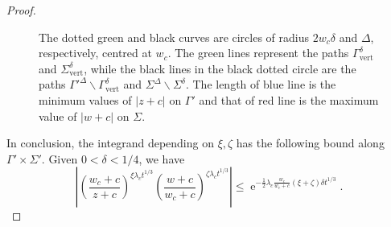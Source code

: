 \documentclass[cmp]{svjour}
\numberwithin{theorem}{section}
\numberwithin{equation}{section}
\DeclareMathOperator{\e}{e}
\begin{document}
\begin{proof}
\begin{figure}[h]
\begin{center}
\end{center}
\caption{The dotted green and black curves are circles of radius $2 w_c \delta$ and $\Delta$, respectively, centred at $w_c$. The green lines represent the paths $\Gamma^{\delta}_{\mathrm{vert}} $ and $ \Sigma^{\delta}_{\mathrm{vert}}$, while the black lines in the black dotted circle are the paths ${\Gamma'}^\Delta \backslash \Gamma^\delta_{\mathrm{vert}}$ and $\Sigma^\Delta \backslash \Sigma^\delta$. The length of blue line is the minimum values of $|z + c|$ on $\Gamma'$ and that of red line is the maximum value of $|w + c|$ on $\Sigma$.}
\label{Fig.CotourVicinityw_c1_text}
\end{figure}




In conclusion, the integrand depending on $\xi,\zeta$ has the following bound along $\Gamma'\times \Sigma'$. Given $0<\delta<1/4$, we have
\begin{equation}\label{XiZetaTermBound}
	\left| 
	\left(\frac{w_c+c}{z+c}\right)^{\xi \lambda_c t^{1/3}}
	\left(\frac{w+c}{w_c+c}\right)^{\zeta \lambda_c t^{1/3}}
	\right| \leq \e^{-\frac{1}{2}\lambda_c \frac{w_c}{w_c + c}(\xi+\zeta)\delta t^{1/3}}.
\end{equation}



\end{proof}
\end{document}
